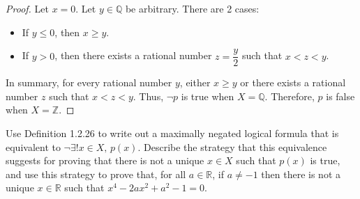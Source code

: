 \begin{mysolution}
\begin{proof}
        Let $x = 0$. Let $y \in \mathbb{Q}$ be arbitrary. There are 2 cases:
        \begin{itemize}
            \item If $y \le 0$, then $x \ge y$.
            \item If $y > 0$, then there exists a rational number $z = \dfrac{y}{2}$ such that $x < z < y$.
        \end{itemize}
        In summary, for every rational number $y$, either $x \ge y$ or there exists a rational number $z$ such that $x < z < y$. Thus, $\neg p$ is true when $X = \mathbb{Q}$. Therefore, $p$ is false when $X = \mathbb{Z}$.
    \end{proof}
\end{mysolution}

\begin{chapex}
Use Definition 1.2.26 to write out a maximally negated logical formula that is equivalent to $\neg \exists! x \in X,\, p(x)$. Describe the strategy that this equivalence suggests for proving that there is not a unique $x \in X$ such that $p(x)$ is true, and use this strategy to prove that, for all $a \in \mathbb{R}$, if $a \ne -1$ then there is not a unique $x \in \mathbb{R}$ such that $x^4-2ax^2+a^2-1=0$.
\end{chapex}

